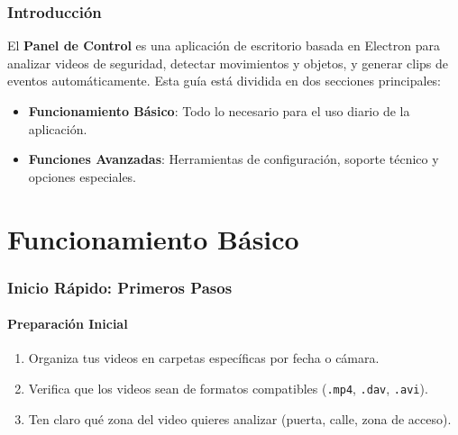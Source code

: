 \documentclass[11pt,a4paper]{article}
\begin{document}
\thispagestyle{empty}

\newpage
\tableofcontents
\newpage


\section{Introducción}
El \textbf{Panel de Control} es una aplicación de escritorio basada en Electron para analizar videos de seguridad, detectar movimientos y objetos, y generar clips de eventos automáticamente. Esta guía está dividida en dos secciones principales:

\begin{itemize}
    \item \textbf{Funcionamiento Básico}: Todo lo necesario para el uso diario de la aplicación.
    \item \textbf{Funciones Avanzadas}: Herramientas de configuración, soporte técnico y opciones especiales.
\end{itemize}

\vspace{1cm}


\part{Funcionamiento Básico}

\section{Inicio Rápido: Primeros Pasos}

\subsection{Preparación Inicial}

\begin{tcolorbox}[colback=primaryblue!10,colframe=primaryblue,title=Antes de comenzar]
\begin{enumerate}
    \item Organiza tus videos en carpetas específicas por fecha o cámara.
    \item Verifica que los videos sean de formatos compatibles (\texttt{.mp4}, \texttt{.dav}, \texttt{.avi}).
    \item Ten claro qué zona del video quieres analizar (puerta, calle, zona de acceso).
\end{enumerate}
\end{tcolorbox}
\end{document}
